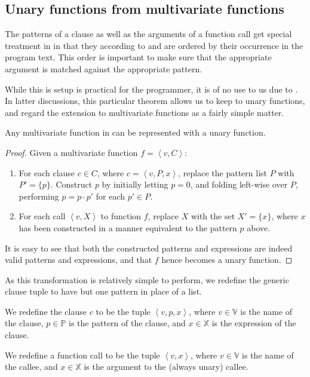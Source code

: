 \subsection{Unary functions from multivariate functions}

The patterns of a clause as well as the arguments of a function call get
special treatment in \D{} in that they according to
 and  are
ordered by their occurrence in the program text. This order is important to
make sure that the appropriate argument is matched against the appropriate
pattern. 

While this is setup is practical for the programmer, it is of no use to us due
to . In latter discussions, this
particular theorem allows us to keep to unary functions, and regard the
extension to multivariate functions as a fairly simple matter.

\begin{theorem}\label{theorem:multivariate-to-unary} Any multivariate function
in \D{} can be represented with a unary function.\end{theorem}

\begin{proof}

Given a multivariate function $f= \left\langle v,C \right\rangle$:

\begin{enumerate}

\item For each clause $c\in C$, where $c=\left\langle v,P,x \right\rangle$,
replace the pattern list $P$ with $P'=\{p\}$. Construct $p$ by initially
letting $p=0$, and folding left-wise over $P$, performing $p=p\cdot p'$ for
each $p'\in P$. 

\item For each call $\left\langle v, X\right\rangle$ to function $f$, replace
$X$ with the set $X'=\{x\}$, where $x$ has been constructed in a manner
equivalent to the pattern $p$ above.

\end{enumerate}

It is easy to see that both the constructed patterns and expressions are indeed
valid patterns and expressions, and that $f$ hence becomes a unary
function.\end{proof}

As this transformation is relatively simple to perform, we redefine the generic
clause tuple to have but one pattern in place of a list. 

\begin{definition} We redefine the clause $c$ to be the tuple $\left\langle
v,p,x\right\rangle$, where $v\in\mathbb{V}$ is the name of the clause,
$p\in\mathbb{P}$ is the pattern of the clause, and $x\in\mathbb{X}$ is the
expression of the clause.\end{definition}

\begin{definition} We redefine a function call to be the tuple $\left\langle
v,x\right\rangle$, where $v\in\mathbb{V}$ is the name of the callee, and
$x\in\mathbb{X}$ is the argument to the (always unary) callee.\end{definition}
